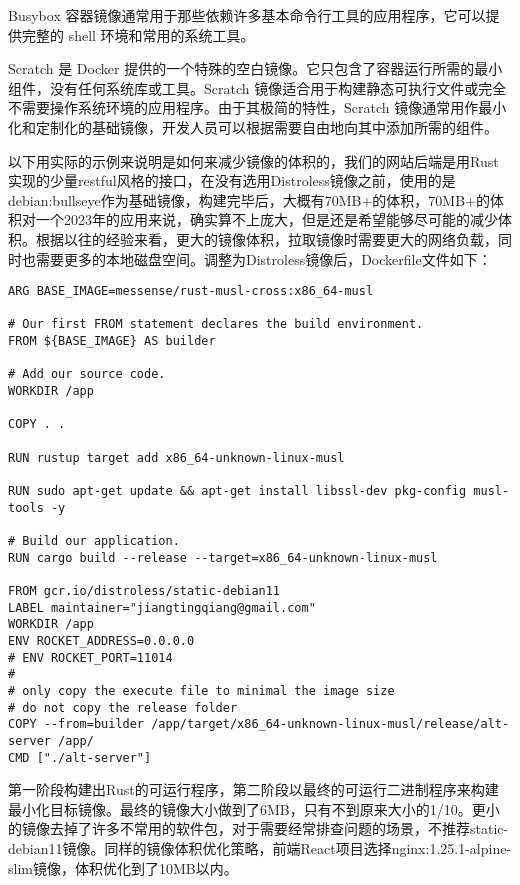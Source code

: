 \documentclass[../../../dolphin-book-2023.tex]{subfiles}
\begin{document}
Busybox 容器镜像通常用于那些依赖许多基本命令行工具的应用程序，它可以提供完整的 shell 环境和常用的系统工具。

Scratch 是 Docker 提供的一个特殊的空白镜像。它只包含了容器运行所需的最小组件，没有任何系统库或工具。Scratch 镜像适合用于构建静态可执行文件或完全不需要操作系统环境的应用程序。由于其极简的特性，Scratch 镜像通常用作最小化和定制化的基础镜像，开发人员可以根据需要自由地向其中添加所需的组件。

以下用实际的示例来说明是如何来减少镜像的体积的，我们的网站后端是用Rust实现的少量restful风格的接口，在没有选用Distroless镜像之前，使用的是debian:bullseye作为基础镜像，构建完毕后，大概有70MB+的体积，70MB+的体积对一个2023年的应用来说，确实算不上庞大，但是还是希望能够尽可能的减少体积。根据以往的经验来看，更大的镜像体积，拉取镜像时需要更大的网络负载，同时也需要更多的本地磁盘空间。调整为Distroless镜像后，Dockerfile文件如下：

\begin{lstlisting}
ARG BASE_IMAGE=messense/rust-musl-cross:x86_64-musl

# Our first FROM statement declares the build environment.
FROM ${BASE_IMAGE} AS builder

# Add our source code.
WORKDIR /app

COPY . .

RUN rustup target add x86_64-unknown-linux-musl

RUN sudo apt-get update && apt-get install libssl-dev pkg-config musl-tools -y

# Build our application.
RUN cargo build --release --target=x86_64-unknown-linux-musl

FROM gcr.io/distroless/static-debian11
LABEL maintainer="jiangtingqiang@gmail.com"
WORKDIR /app
ENV ROCKET_ADDRESS=0.0.0.0
# ENV ROCKET_PORT=11014
#
# only copy the execute file to minimal the image size
# do not copy the release folder
COPY --from=builder /app/target/x86_64-unknown-linux-musl/release/alt-server /app/
CMD ["./alt-server"]
\end{lstlisting}

第一阶段构建出Rust的可运行程序，第二阶段以最终的可运行二进制程序来构建最小化目标镜像。最终的镜像大小做到了6MB，只有不到原来大小的1/10。更小的镜像去掉了许多不常用的软件包，对于需要经常排查问题的场景，不推荐static-debian11镜像。同样的镜像体积优化策略，前端React项目选择nginx:1.25.1-alpine-slim镜像，体积优化到了10MB以内。
\end{document}
